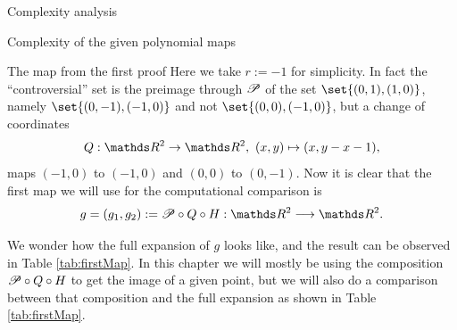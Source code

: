 \documentclass[11pt, a4paper, english, twoside, notitlepage, openright]{report}
\begin{document}
\begin{chapter}{Complexity analysis}
\begin{section}{Complexity of the given polynomial maps}
\begin{subsection}{The map from the first proof}
Here we take $r:=-1$ for simplicity. In fact the ``controversial'' set is the preimage through $\P$ of the set $\set{(0,1),(1,0)}$, namely $\set{(0,-1),(-1,0)}$ and not $\set{(0,0),(-1,0)}$, but a change of coordinates 
$$
Q:\R^2\to\R^2,\ (x,y)\mapsto(x,y-x-1),
$$
maps $(-1,0)$ to $(-1,0)$ and $(0,0)$ to $(0,-1)$. Now it is clear that the first map we will use for the computational comparison is
$$
g=(g_1, g_2):=\P\circ Q\circ H:\R^2\longrightarrow\R^2.
$$

We wonder how the full expansion of $g$ looks like, and the result can be observed in Table \ref{tab:firstMap}. In this chapter we will mostly be using the composition $\P\circ Q\circ H$ to get the image of a given point, but we will also do a comparison between that composition and the full expansion as shown in Table \ref{tab:firstMap}.


\end{subsection}
\end{section}
\end{chapter}
\end{document}
